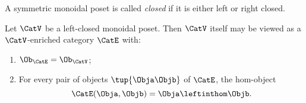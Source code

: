 \begin{ctdefinition}
\label{def:moindal-poset-cat-closed}
A symmetric monoidal poset is called \emph{closed} if it is either left or right closed. 
\end{ctdefinition}


\begin{lemma}
\label{lem:monoidal-closed-poset-self-enriched}
Let $\CatV$ be a left-closed monoidal poset. Then $\CatV$ itself may be viewed as a $\CatV$-enriched category $\CatE$ with:
\begin{enumerate}
\item $\Ob_\CatE = \Ob_\CatV$;
\item For every pair of objects $\tup{\Obja \Objb}$ of $\CatE$, the hom-object
\begin{equation}
\CatE(\Obja, \Objb) = \Obja \leftinthom \Objb.
\end{equation}
\end{enumerate}
\end{lemma}

